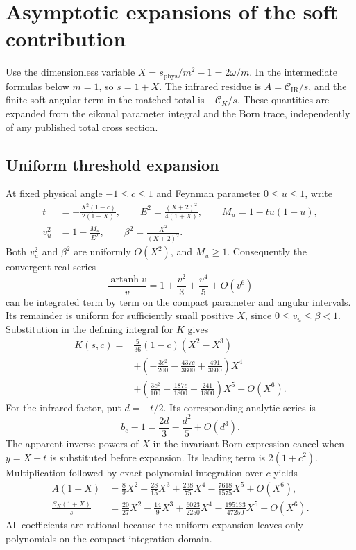 \section{Asymptotic expansions of the soft contribution}
\label{sec:comp-soft-asymptotic}
Use the dimensionless variable $X=s_{\mathrm{phys}}/m^2-1=2\omega/m$.  In the intermediate
formulas below $m=1$, so $s=1+X$.  The infrared residue is
$A=\mathcal C_{\mathrm{IR}}/s$, and the finite soft angular term in the
matched total is $-\mathcal C_K/s$.  These quantities are expanded from
the eikonal parameter integral and the Born trace, independently of any
published total cross section.

\subsection{Uniform threshold expansion}
At fixed physical angle $-1\leq c\leq1$ and Feynman parameter
$0\leq u\leq1$, write
\begin{align}
 t&=-\frac{X^2(1-c)}{2(1+X)},\qquad
 E^2=\frac{(X+2)^2}{4(1+X)},\qquad
 M_u=1-tu(1-u),\\
 v_u^2&=1-\frac{M_u}{E^2},\qquad \beta^2=\frac{X^2}{(X+2)^2}.
\end{align}
Both $v_u^2$ and $\beta^2$ are uniformly $O(X^2)$, and $M_u\geq1$.
Consequently the convergent real series
\begin{equation}
 \frac{\operatorname{artanh}v}{v}
 =1+\frac{v^2}{3}+\frac{v^4}{5}+O(v^6)
\end{equation}
can be integrated term by term on the compact parameter and angular
intervals.  Its remainder is uniform for sufficiently small positive
$X$, since $0\leq v_u\leq\beta<1$.
Substitution in the defining integral for $K$ gives
\begin{align}
 K(s,c)={}&\frac5{36}(1-c)(X^2-X^3)\\
 &+\left(-\frac{3c^2}{200}-\frac{437c}{3600}
                              +\frac{491}{3600}\right)X^4\\
 &+\left(\frac{3c^2}{100}+\frac{187c}{1800}
                              -\frac{241}{1800}\right)X^5+O(X^6).
\end{align}
For the infrared factor, put $d=-t/2$.  Its corresponding analytic series is
\begin{equation}
 b_e-1=\frac{2d}{3}-\frac{d^2}{5}+O(d^3).
\end{equation}
The apparent inverse powers of $X$ in the invariant Born expression
cancel when $y=X+t$ is substituted before expansion.  Its leading term
is $2(1+c^2)$.  Multiplication followed by exact polynomial integration
over $c$ yields
\begin{align}
 A(1+X)&=\frac89X^2-\frac{28}{15}X^3+\frac{238}{75}X^4
                          -\frac{7618}{1575}X^5+O(X^6),\\
 \frac{\mathcal C_K(1+X)}{s}
 &=\frac{20}{27}X^2-\frac{14}{9}X^3+\frac{6023}{2250}X^4
                          -\frac{195133}{47250}X^5+O(X^6).
\end{align}
All coefficients are rational because the uniform expansion leaves
only polynomials on the compact integration domain.

